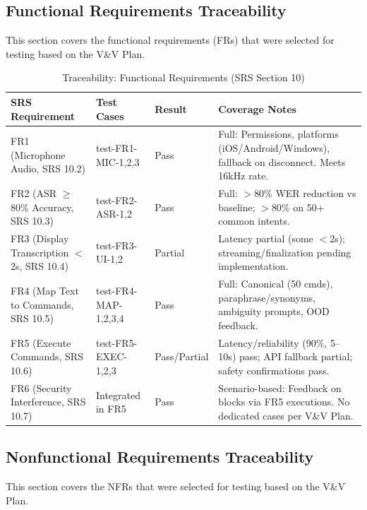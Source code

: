 \documentclass[12pt, titlepage]{article}
\begin{document}
\subsection{Functional Requirements Traceability}
This section covers the functional requirements (FRs) that were selected for testing based on the V\&V Plan. 
\begin{table}[H]
\centering
\caption{Traceability: Functional Requirements (SRS Section 10)}
\label{tab:trace-fr}
\renewcommand{\arraystretch}{1.2}
\begin{tabular}{|p{3cm}|p{4cm}|p{2cm}|p{4.5cm}|}
\hline
\textbf{SRS Requirement} & \textbf{Test Cases} & \textbf{Result} & \textbf{Coverage Notes} \\
\hline
FR1 (Microphone Audio, SRS 10.2) & test-FR1-MIC-1,2,3 & Pass & Full: Permissions, platforms (iOS/Android/Windows), fallback on disconnect. Meets 16kHz rate. \\
\hline
FR2 (ASR $\geq$80\% Accuracy, SRS 10.3) & test-FR2-ASR-1,2 & Pass & Full: $>$80\% WER reduction vs baseline; $>$80\% on 50+ common intents. \\
\hline
FR3 (Display Transcription $<$2s, SRS 10.4) & test-FR3-UI-1,2 & Partial & Latency partial (some $<$2s); streaming/finalization pending implementation. \\
\hline
FR4 (Map Text to Commands, SRS 10.5) & test-FR4-MAP-1,2,3,4 & Pass & Full: Canonical (50 cmds), paraphrase/synonyms, ambiguity prompts, OOD feedback. \\
\hline
FR5 (Execute Commands, SRS 10.6) & test-FR5-EXEC-1,2,3 & Pass/Partial & Latency/reliability (90\%, 5--10s) pass; API fallback partial; safety confirmations pass. \\
\hline
FR6 (Security Interference, SRS 10.7) & Integrated in FR5 & Pass & Scenario-based: Feedback on blocks via FR5 executions. No dedicated cases per V\&V Plan. \\
\hline
\end{tabular}
\end{table}

\subsection{Nonfunctional Requirements Traceability}
This section covers the NFRs that were selected for testing based on the V\&V Plan.
\end{document}
